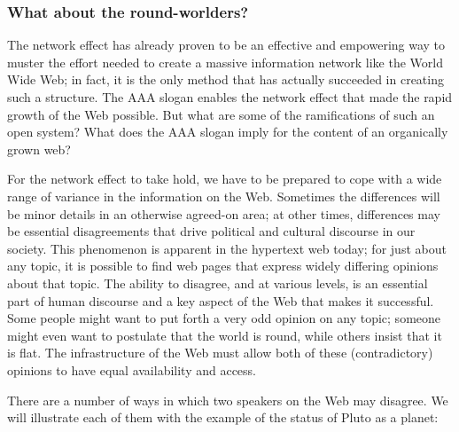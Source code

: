 \subsubsection{What about the round-worlders?}

The network effect has already proven to be an effective and empowering
way to muster the effort needed to create a massive information network
like the World Wide Web; in fact, it is the only method that has
actually succeeded in creating such a structure. The AAA slogan enables
the network effect that made the rapid growth of the Web possible. But
what are some of the ramifications of such an open system? What does the
AAA slogan imply for the content of an organically grown web?

For the network effect to take hold, we have to be prepared to cope with
a wide range of variance in the information on the Web. Sometimes the
differences will be minor details in an otherwise agreed-on area; at
other times, differences may be essential disagreements that drive
political and cultural discourse in our society. This phenomenon is
apparent in the hypertext web today; for just about any topic, it is
possible to find web pages that express widely differing opinions about
that topic. The ability to disagree, and at various levels, is an
essential part of human discourse and a key aspect of the Web that makes
it successful. Some people might want to put forth a very odd opinion on
any topic; someone might even want to postulate that the world is round,
while others insist that it is flat. The infrastructure of the Web must
allow both of these (contradictory) opinions to have equal availability
and access.

There are a number of ways in which two speakers on the Web may
disagree. We will illustrate each of them with the example of the status
of Pluto as a planet:


